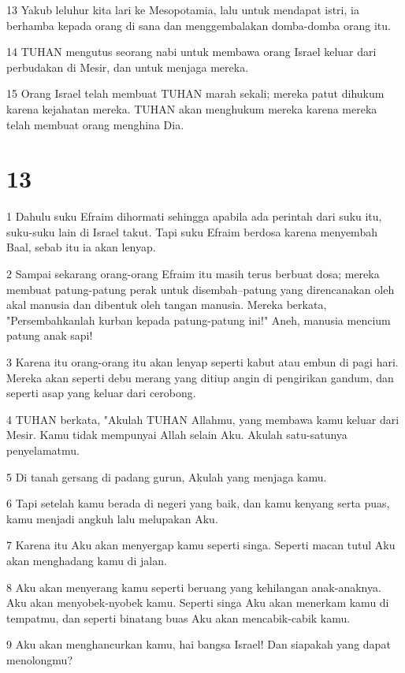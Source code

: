 \par 13 Yakub leluhur kita lari ke Mesopotamia, lalu untuk mendapat istri, ia berhamba kepada orang di sana dan menggembalakan domba-domba orang itu.
\par 14 TUHAN mengutus seorang nabi untuk membawa orang Israel keluar dari perbudakan di Mesir, dan untuk menjaga mereka.
\par 15 Orang Israel telah membuat TUHAN marah sekali; mereka patut dihukum karena kejahatan mereka. TUHAN akan menghukum mereka karena mereka telah membuat orang menghina Dia.

\chapter{13}

\par 1 Dahulu suku Efraim dihormati sehingga apabila ada perintah dari suku itu, suku-suku lain di Israel takut. Tapi suku Efraim berdosa karena menyembah Baal, sebab itu ia akan lenyap.
\par 2 Sampai sekarang orang-orang Efraim itu masih terus berbuat dosa; mereka membuat patung-patung perak untuk disembah--patung yang direncanakan oleh akal manusia dan dibentuk oleh tangan manusia. Mereka berkata, "Persembahkanlah kurban kepada patung-patung ini!" Aneh, manusia mencium patung anak sapi!
\par 3 Karena itu orang-orang itu akan lenyap seperti kabut atau embun di pagi hari. Mereka akan seperti debu merang yang ditiup angin di pengirikan gandum, dan seperti asap yang keluar dari cerobong.
\par 4 TUHAN berkata, "Akulah TUHAN Allahmu, yang membawa kamu keluar dari Mesir. Kamu tidak mempunyai Allah selain Aku. Akulah satu-satunya penyelamatmu.
\par 5 Di tanah gersang di padang gurun, Akulah yang menjaga kamu.
\par 6 Tapi setelah kamu berada di negeri yang baik, dan kamu kenyang serta puas, kamu menjadi angkuh lalu melupakan Aku.
\par 7 Karena itu Aku akan menyergap kamu seperti singa. Seperti macan tutul Aku akan menghadang kamu di jalan.
\par 8 Aku akan menyerang kamu seperti beruang yang kehilangan anak-anaknya. Aku akan menyobek-nyobek kamu. Seperti singa Aku akan menerkam kamu di tempatmu, dan seperti binatang buas Aku akan mencabik-cabik kamu.
\par 9 Aku akan menghancurkan kamu, hai bangsa Israel! Dan siapakah yang dapat menolongmu?
